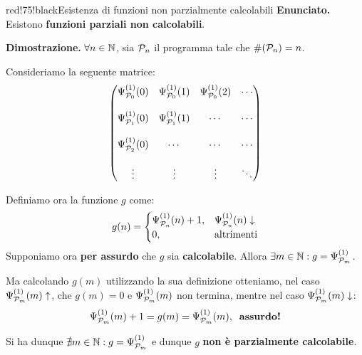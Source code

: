 \begin{halfframedbox}{red!75!black}{Esistenza di funzioni non parzialmente calcolabili}\label{Esistenza funzioni non calcolabili}
  \textbf{Enunciato. } Esistono \textbf{funzioni parziali non calcolabili}.

  \begin{center}
    \textcolor{red!75!black}{\hdashrule[0.5ex]{18cm}{1pt}{3mm 3pt 1mm 2pt}}
  \end{center}

  \textbf{Dimostrazione. } \(\forall n \in \mathbb{N}\), sia \(\mathcal{P}_n\) il programma tale che \(\# (\mathcal{P}_n)=n\).

  Consideriamo la seguente matrice:
\begin{eqnarray}
  \begin{pmatrix}
    \Psi_{\mathcal{P}_0}^{(1)}(0) & \Psi_{\mathcal{P}_0}^{(1)}(1) & \Psi_{\mathcal{P}_0}^{(1)}(2) & \cdots\\
    \\
    \Psi_{\mathcal{P}_1}^{(1)}(0) & \Psi_{\mathcal{P}_1}^{(1)}(1) & \cdots & \cdots\\
    \\
    \Psi_{\mathcal{P}_2}^{(1)}(0) & \cdots & \cdots & \cdots\\
    \\
    \vdots & \vdots & \vdots & \ddots
  \end{pmatrix}
\end{eqnarray}

  Definiamo ora la funzione \(g\) come:
  \begin{equation}
    g(n)=\begin{cases}
      \Psi_{\mathcal{P}_n}^{(1)}(n)+1, & \Psi_{\mathcal{P}_n}^{(1)}(n) \downarrow\\
      0, & \text{altrimenti}
    \end{cases}
  \end{equation}
  Supponiamo ora \textbf{per assurdo} che \(g\) sia \textbf{calcolabile}. Allora \(\exists m \in \mathbb{N}: g=\Psi_{\mathcal{P}_m}^{(1)}\).

  Ma calcolando \(g(m)\) utilizzando la sua definizione otteniamo, nel caso \(\Psi_{\mathcal{P}_m}^{(1)}(m) \uparrow\), che \(g(m)=0\) e \(\Psi_{\mathcal{P}_m}^{(1)}(m)\) non termina, mentre nel caso \(\Psi_{\mathcal{P}_m}^{(1)}(m) \downarrow\):
  \begin{equation}
    \Psi_{\mathcal{P}_m}^{(1)}(m)+1=g(m)=\Psi_{\mathcal{P}_m}^{(1)}(m), \;\; \textbf{assurdo!}
  \end{equation}

  Si ha dunque \(\nexists m \in \mathbb{N}: g=\Psi_{\mathcal{P}_m}^{(1)}\) e dunque \(g\) \textbf{non è parzialmente calcolabile}.
\end{halfframedbox}

